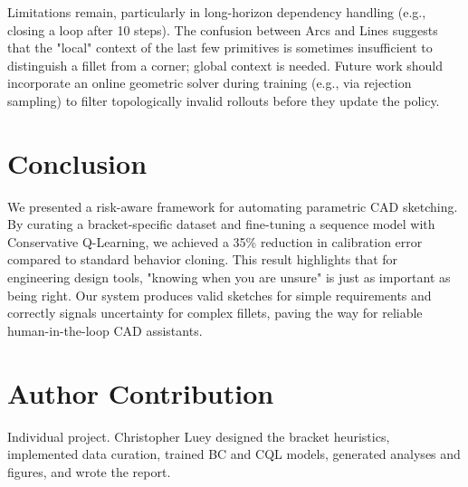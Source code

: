 \documentclass[conference]{IEEEtran}
\begin{document}
Limitations remain, particularly in long-horizon dependency handling (e.g., closing a loop after 10 steps). The confusion between Arcs and Lines suggests that the "local" context of the last few primitives is sometimes insufficient to distinguish a fillet from a corner; global context is needed. Future work should incorporate an online geometric solver during training (e.g., via rejection sampling) to filter topologically invalid rollouts before they update the policy.

\section{Conclusion}
We presented a risk-aware framework for automating parametric CAD sketching. By curating a bracket-specific dataset and fine-tuning a sequence model with Conservative Q-Learning, we achieved a 35\% reduction in calibration error compared to standard behavior cloning. This result highlights that for engineering design tools, "knowing when you are unsure" is just as important as being right. Our system produces valid sketches for simple requirements and correctly signals uncertainty for complex fillets, paving the way for reliable human-in-the-loop CAD assistants.

\section{Author Contribution}
Individual project. Christopher Luey designed the bracket heuristics, implemented data curation, trained BC and CQL models, generated analyses and figures, and wrote the report.



\end{document}
